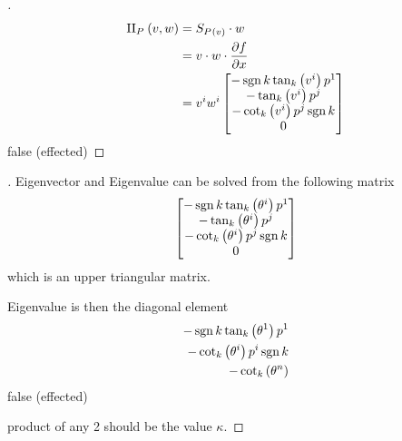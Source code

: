 \documentclass[stu, babel, american, biblatex, a4paper, draftall]{apa7}
\begin{document}
\begin{proof}[]
    \skipped

    \begin{align*}
        \text{II}_{\tensor{P}{}}\left(v,w\right)
         & = S_{\tensor{P}{}\left(v\right)} \cdot w                  \\
         & = v \cdot w \cdot \frac{\partial f}{\partial x}           \\
         & = \tensor{v}{^i}\tensor{w}{^i} \begin{bmatrix}
            -\sign{k}\tan_k\left(\tensor{v}{^i}\right)\tensor{p}{^1} \\
            -\tan_k\left(\tensor{v}{^i}\right)\tensor{p}{^j}         \\
            -\cot_k\left(\tensor{v}{^i}\right)\tensor{p}{^j}\sign{k} \\
            0                                                        \\
        \end{bmatrix}
    \end{align*}
    false (effected)
\end{proof}
\begin{lemma}\label{Model:PrincipalCurvature}

\end{lemma}
\begin{proof}[]
    \skipped

    Eigenvector and Eigenvalue can be solved from the following matrix
    \begin{align*}
        \begin{bmatrix}
            -\sign{k}\tan_k\left(\tensor{\theta}{^i}\right)\tensor{p}{^1} \\
            -\tan_k\left(\tensor{\theta}{^i}\right)\tensor{p}{^j}         \\
            -\cot_k\left(\tensor{\theta}{^i}\right)\tensor{p}{^j}\sign{k} \\
            0                                                             \\
        \end{bmatrix}
    \end{align*}
    which is an upper triangular matrix.

    Eigenvalue is then the diagonal element
    \begin{align*}
        -\sign{k}\tan_k\left(\tensor{\theta}{^1}\right)\tensor{p}{^1} \\
        -\cot_k\left(\tensor{\theta}{^i}\right)\tensor{p}{^i}\sign{k} \\
        -\cot_k\left(\tensor{\theta}{^n}\right)
    \end{align*}
    false (effected)

    product of any 2 should be the value $\kappa$.
\end{proof}
\end{document}
